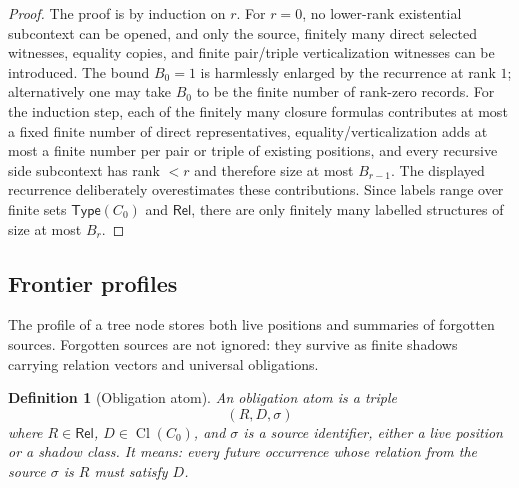 \documentclass[11pt]{article}
\newtheorem{definition}[theorem]{Definition}
\newcommand{\Rel}{\mathsf{Rel}}
\newcommand{\Cl}{\operatorname{Cl}}
\newcommand{\Typ}{\mathsf{Type}}
\begin{document}
\begin{proof}
The proof is by induction on $r$.  For $r=0$, no lower-rank existential subcontext can be opened, and only the source, finitely many direct selected witnesses, equality copies, and finite pair/triple verticalization witnesses can be introduced.  The bound $B_0=1$ is harmlessly enlarged by the recurrence at rank $1$; alternatively one may take $B_0$ to be the finite number of rank-zero records.  For the induction step, each of the finitely many closure formulas contributes at most a fixed finite number of direct representatives, equality/verticalization adds at most a finite number per pair or triple of existing positions, and every recursive side subcontext has rank $<r$ and therefore size at most $B_{r-1}$.  The displayed recurrence deliberately overestimates these contributions.  Since labels range over finite sets $\Typ(C_0)$ and $\Rel$, there are only finitely many labelled structures of size at most $B_r$.
\end{proof}

\subsection{Frontier profiles}

The profile of a tree node stores both live positions and summaries of forgotten sources.  Forgotten sources are not ignored: they survive as finite shadows carrying relation vectors and universal obligations.

\begin{definition}[Obligation atom]
An obligation atom is a triple
\[
  (R,D,\sigma)
\]
where $R\in\Rel$, $D\in\Cl(C_0)$, and $\sigma$ is a source identifier, either a live position or a shadow class.  It means: every future occurrence whose relation from the source $\sigma$ is $R$ must satisfy $D$.
\end{definition}
\end{document}

